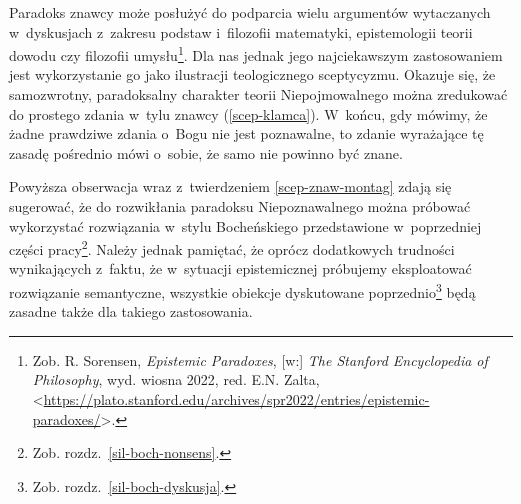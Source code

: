 Paradoks znawcy może posłużyć do podparcia wielu argumentów wytaczanych w~dyskusjach z~zakresu podstaw i~filozofii matematyki, epistemologii teorii dowodu czy filozofii umysłu\footnote{Zob. R. Sorensen, \textit{Epistemic Paradoxes}, [w:] \textit{The Stanford Encyclopedia of Philosophy}, wyd. wiosna 2022, red. E.N. Zalta, <\url{https://plato.stanford.edu/archives/spr2022/entries/epistemic-paradoxes/}>.}. Dla nas jednak jego najciekawszym zastosowaniem jest wykorzystanie go jako ilustracji teologicznego sceptycyzmu. Okazuje się, że samozwrotny, paradoksalny charakter teorii Niepojmowalnego można zredukować do prostego zdania w~tylu znawcy (\ref{scep-klamca}). W~końcu, gdy mówimy, że żadne prawdziwe zdania o~Bogu nie jest poznawalne, to zdanie wyrażające tę zasadę pośrednio mówi o~sobie, że samo nie powinno być znane.

Powyższa obserwacja wraz z~twierdzeniem \ref{scep-znaw-montag} zdają się sugerować, że do rozwikłania paradoksu Niepoznawalnego można próbować wykorzystać rozwiązania w~stylu Bocheńskiego przedstawione w~poprzedniej części pracy\footnote{Zob. rozdz.~\ref{sil-boch-nonsens}.}. Należy jednak pamiętać, że oprócz dodatkowych trudności wynikających z~faktu, że w~sytuacji epistemicznej próbujemy eksploatować rozwiązanie semantyczne, wszystkie obiekcje dyskutowane poprzednio\footnote{Zob. rozdz.~\ref{sil-boch-dyskusja}.} będą zasadne także dla takiego zastosowania.


